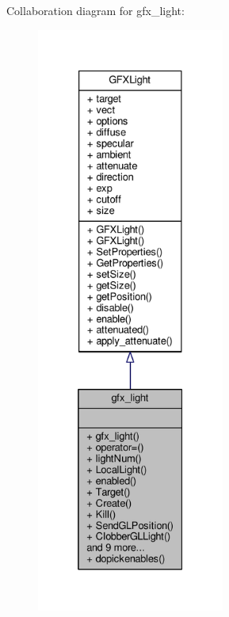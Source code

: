 Collaboration diagram for gfx\+\_\+light\+:
\nopagebreak
\begin{figure}[H]
\begin{center}
\leavevmode
\includegraphics[height=550pt]{da/dec/classgfx__light__coll__graph}
\end{center}
\end{figure}

